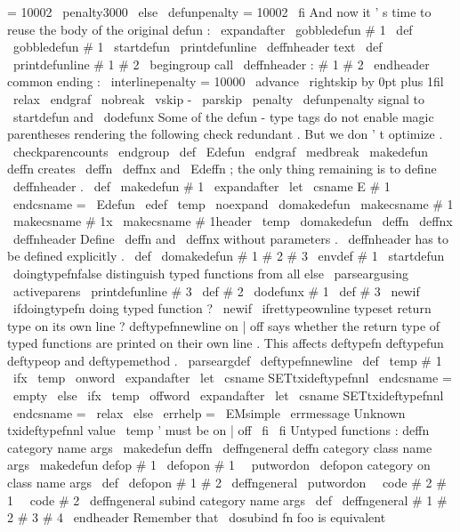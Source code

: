 {{{{{=
10002
\
penalty3000
\
else
\
defunpenalty
=
10002
\
fi
%
%
And
now
it
'
s
time
to
reuse
the
body
of
the
original
defun
:
\
expandafter
\
gobbledefun
#
1
%
}
\
def
\
gobbledefun
#
1
\
startdefun
{
}
%
\
printdefunline
\
deffnheader
{
text
}
%
\
def
\
printdefunline
#
1
#
2
{
%
\
begingroup
%
call
\
deffnheader
:
#
1
#
2
\
endheader
%
common
ending
:
\
interlinepenalty
=
10000
\
advance
\
rightskip
by
0pt
plus
1fil
\
relax
\
endgraf
\
nobreak
\
vskip
-
\
parskip
\
penalty
\
defunpenalty
%
signal
to
\
startdefun
and
\
dodefunx
%
Some
of
the
defun
-
type
tags
do
not
enable
magic
parentheses
%
rendering
the
following
check
redundant
.
But
we
don
'
t
optimize
.
\
checkparencounts
\
endgroup
}
\
def
\
Edefun
{
\
endgraf
\
medbreak
}
%
\
makedefun
{
deffn
}
creates
\
deffn
\
deffnx
and
\
Edeffn
;
%
the
only
thing
remaining
is
to
define
\
deffnheader
.
%
\
def
\
makedefun
#
1
{
%
\
expandafter
\
let
\
csname
E
#
1
\
endcsname
=
\
Edefun
\
edef
\
temp
{
\
noexpand
\
domakedefun
\
makecsname
{
#
1
}
\
makecsname
{
#
1x
}
\
makecsname
{
#
1header
}
}
%
\
temp
}
%
\
domakedefun
\
deffn
\
deffnx
\
deffnheader
%
%
Define
\
deffn
and
\
deffnx
without
parameters
.
%
\
deffnheader
has
to
be
defined
explicitly
.
%
\
def
\
domakedefun
#
1
#
2
#
3
{
%
\
envdef
#
1
{
%
\
startdefun
\
doingtypefnfalse
%
distinguish
typed
functions
from
all
else
\
parseargusing
\
activeparens
{
\
printdefunline
#
3
}
%
}
%
\
def
#
2
{
\
dodefunx
#
1
}
%
\
def
#
3
%
}
\
newif
\
ifdoingtypefn
%
doing
typed
function
?
\
newif
\
ifrettypeownline
%
typeset
return
type
on
its
own
line
?
%
deftypefnnewline
on
|
off
says
whether
the
return
type
of
typed
functions
%
are
printed
on
their
own
line
.
This
affects
deftypefn
deftypefun
%
deftypeop
and
deftypemethod
.
%
\
parseargdef
\
deftypefnnewline
{
%
\
def
\
temp
{
#
1
}
%
\
ifx
\
temp
\
onword
\
expandafter
\
let
\
csname
SETtxideftypefnnl
\
endcsname
=
\
empty
\
else
\
ifx
\
temp
\
offword
\
expandafter
\
let
\
csname
SETtxideftypefnnl
\
endcsname
=
\
relax
\
else
\
errhelp
=
\
EMsimple
\
errmessage
{
Unknown
txideftypefnnl
value
\
temp
'
must
be
on
|
off
}
%
\
fi
\
fi
}
%
Untyped
functions
:
%
deffn
category
name
args
\
makedefun
{
deffn
}
{
\
deffngeneral
{
}
}
%
deffn
category
class
name
args
\
makedefun
{
defop
}
#
1
{
\
defopon
{
#
1
\
\
putwordon
}
}
%
\
defopon
{
category
on
}
class
name
args
\
def
\
defopon
#
1
#
2
{
\
deffngeneral
{
\
putwordon
\
\
code
{
#
2
}
}
{
#
1
\
\
code
{
#
2
}
}
}
%
\
deffngeneral
{
subind
}
category
name
args
%
\
def
\
deffngeneral
#
1
#
2
#
3
#
4
\
endheader
{
%
%
Remember
that
\
dosubind
{
fn
}
{
foo
}
{
}
is
equivalent
}}}}}
